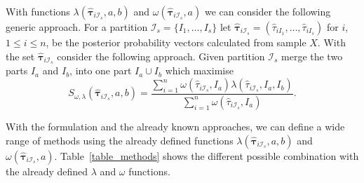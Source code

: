 \documentclass[10pt, a4paper]{article}
\newcommand{\m}[1]{\boldsymbol{#1}}
\begin{document}

With functions $\lambda(\hat{\m \tau}_{i \mathcal{I}_s}, a, b)$ and $\omega(\hat{\m \tau}_{i \mathcal{I}_s}, a)$ we can consider the following generic approach. For a partition $\mathcal{I}_s = \{ I_1, \dots, I_s\}$ let $\hat{\m\tau}_{i \mathcal{I}_s} = \left( \hat{\tau}_{i I_1} , \dots, \hat{\tau}_{i I_s}  \right)$ for $i$, $1 \leq i \leq n$, be the posterior probability vectors calculated from sample $X$. With the set $\hat{\m\tau}_{i \mathcal{I}_s}$ consider the following approach. Given partition $\mathcal{I}_s$ merge the two parts $I_a$ and $I_b$, into one part $I_a \cup I_b$ which maximise
\begin{equation}\label{unifying_equation}
S_{\omega, \lambda}( \hat{\m \tau}_{i \mathcal{I}_s}, a, b) = \frac{\sum_{i=1}^n \omega(\hat{\tau}_{i \mathcal{I}_s}, I_a) \lambda(\hat{\tau}_{i \mathcal{I}_s}, I_a, I_b)}{\sum_{i=1}^n \omega(\hat{\tau}_{i \mathcal{I}_s}, I_a) }.
\end{equation}


With the formulation and the already known approaches, we can define a wide range of methods using the already defined functions $\lambda(\hat{\m \tau}_{i \mathcal{I}_s}, a, b)$ and $\omega(\hat{\m \tau}_{i \mathcal{I}_s}, a)$. Table~\ref{table_methods} shows the different possible combination with the already defined $\lambda$ and $\omega$ functions. 
\end{document}
